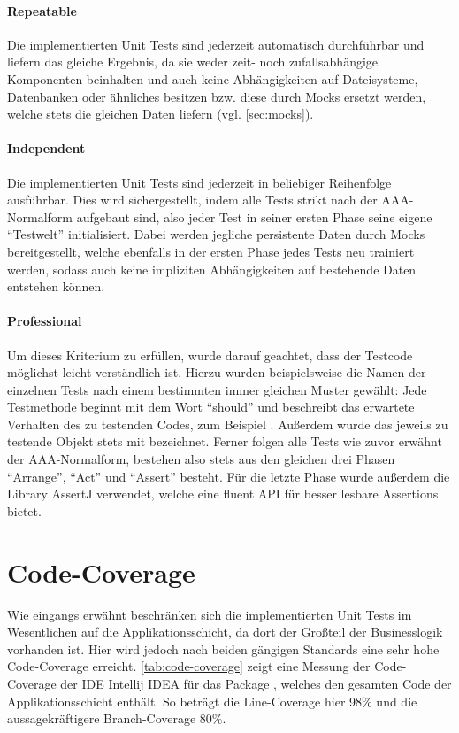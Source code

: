 \paragraph{Repeatable} Die implementierten Unit Tests sind jederzeit automatisch durchführbar und liefern das gleiche Ergebnis, da sie weder zeit- noch zufallsabhängige Komponenten beinhalten und auch keine Abhängigkeiten auf Dateisysteme, Datenbanken oder ähnliches besitzen bzw. diese durch Mocks ersetzt werden, welche stets die gleichen Daten liefern (vgl. \autoref{sec:mocks}).

\paragraph{Independent} Die implementierten Unit Tests sind jederzeit in beliebiger Reihenfolge ausführbar. Dies wird sichergestellt, indem alle Tests strikt nach der AAA-Normalform aufgebaut sind, also jeder Test in seiner ersten Phase seine eigene \enquote{Testwelt} initialisiert. Dabei werden jegliche persistente Daten durch Mocks bereitgestellt, welche ebenfalls in der ersten Phase jedes Tests neu trainiert werden, sodass auch keine impliziten Abhängigkeiten auf bestehende Daten entstehen können.

\paragraph{Professional} Um dieses Kriterium zu erfüllen, wurde darauf geachtet, dass der Testcode möglichst leicht verständlich ist. Hierzu wurden beispielsweise die Namen der einzelnen Tests nach einem bestimmten immer gleichen Muster gewählt: Jede Testmethode beginnt mit dem Wort \enquote{should} und beschreibt das erwartete Verhalten des zu testenden Codes, zum Beispiel . Außerdem wurde das jeweils zu testende Objekt stets mit  bezeichnet. Ferner folgen alle Tests wie zuvor erwähnt der AAA-Normalform, bestehen also stets aus den gleichen drei Phasen \enquote{Arrange}, \enquote{Act} und \enquote{Assert} besteht. Für die letzte Phase wurde außerdem die Library AssertJ verwendet, welche eine fluent \ac{API} für besser lesbare Assertions bietet.

\section{Code-Coverage}
\label{sec:code-coverage}
Wie eingangs erwähnt beschränken sich die implementierten Unit Tests im Wesentlichen auf die Applikationsschicht, da dort der Großteil der Businesslogik vorhanden ist. Hier wird jedoch nach beiden gängigen Standards eine sehr hohe Code-Coverage erreicht. \autoref{tab:code-coverage} zeigt eine Messung der Code-Coverage der \acs{IDE} Intellij IDEA für das Package , welches den gesamten Code der Applikationsschicht enthält. So beträgt die Line-Coverage hier 98\% und die aussagekräftigere Branch-Coverage 80\%.


